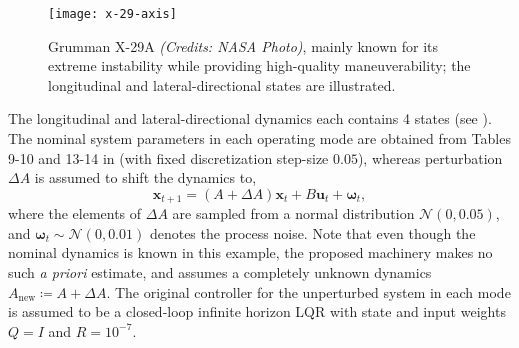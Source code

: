 \documentclass[journal]{IEEEtran}
\theoremstyle{definition}
\theoremstyle{remark}
\newcommand\x{{\bm x}}
\def\u{{\bm u}}
\newcommand\oomega{{\bm \omega}}
\begin{document}
    \begin{figure}[t]
        \centering
        \texttt{[image: x-29-axis]}
        \caption{Grumman X-29A \textit{(Credits: NASA Photo)}, mainly known for its extreme instability while providing high-quality maneuverability; the longitudinal and lateral-directional states are illustrated.}
        \label{fig:x-29real}
        \vspace{-0.3cm} 
    \end{figure}
    
    
     The longitudinal and lateral-directional dynamics each contains 4 states (see ). The nominal system parameters in each operating mode are obtained from Tables 9-10 and 13-14 in \cite{bosworth1992linearized} (with fixed  discretization step-size $0.05$), whereas perturbation $\Delta A$ is assumed to shift the dynamics to,
    \[\x_{t+1} = (A+\Delta A) \x_t + B \u_t+\oomega_t,\]
    where the elements of $\Delta A$ are sampled from a normal distribution  $\mathcal{N}(0,0.05)$, and $\oomega_t\sim \mathcal{N}(0,0.01)$ denotes the process noise.
   Note that even though the nominal dynamics is known in this example, the proposed machinery makes no such \textit{a priori} estimate, and assumes a completely unknown dynamics $A_{\text{new}} \coloneqq A+\Delta A$.
   {\color{violet}
   The original controller for the unperturbed system in each mode is assumed to be a closed-loop infinite horizon \ac{LQR} with state and input weights $Q=I$ and $R =10^{-7}$.
   }
    
\end{document}
